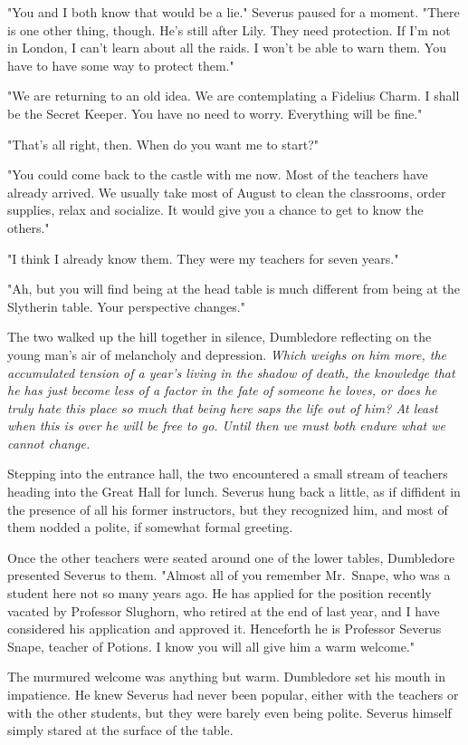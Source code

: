 "You and I both know that would be a lie." Severus paused for a moment. "There is one other thing, though. He's still after Lily. They need protection. If I'm not in London, I can't learn about all the raids. I won't be able to warn them. You have to have some way to protect them."

"We are returning to an old idea. We are contemplating a Fidelius Charm. I shall be the Secret Keeper. You have no need to worry. Everything will be fine."

"That's all right, then. When do you want me to start?"

"You could come back to the castle with me now. Most of the teachers have already arrived. We usually take most of August to clean the classrooms, order supplies, relax and socialize. It would give you a chance to get to know the others."

"I think I already know them. They were my teachers for seven years."

"Ah, but you will find being at the head table is much different from being at the Slytherin table. Your perspective changes."

The two walked up the hill together in silence, Dumbledore reflecting on the young man's air of melancholy and depression. \emph{Which weighs on him more, the accumulated tension of a year's living in the shadow of death, the knowledge that he has just become less of a factor in the fate of someone he loves, or does he truly hate this place so much that being here saps the life out of him? At least when this is over he will be free to go. Until then we must both endure what we cannot change.}

Stepping into the entrance hall, the two encountered a small stream of teachers heading into the Great Hall for lunch. Severus hung back a little, as if diffident in the presence of all his former instructors, but they recognized him, and most of them nodded a polite, if somewhat formal greeting.

Once the other teachers were seated around one of the lower tables, Dumbledore presented Severus to them. "Almost all of you remember Mr.~Snape, who was a student here not so many years ago. He has applied for the position recently vacated by Professor Slughorn, who retired at the end of last year, and I have considered his application and approved it. Henceforth he is Professor Severus Snape, teacher of Potions. I know you will all give him a warm welcome."

The murmured welcome was anything but warm. Dumbledore set his mouth in impatience. He knew Severus had never been popular, either with the teachers or with the other students, but they were barely even being polite. Severus himself simply stared at the surface of the table.

